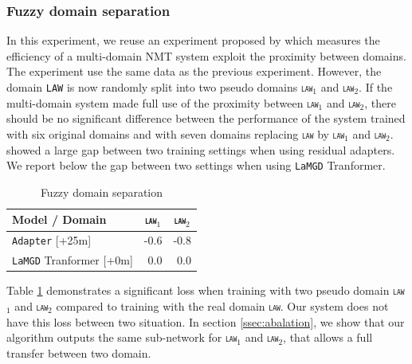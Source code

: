 \documentclass[11pt]{article}
\newcommand{\domain}[1]{\texttt{\textsc{#1}}}
\newcommand{\system}[1]{\texttt{{#1}}}
\begin{document}
\subsubsection{Fuzzy domain separation}
\label{ssec:fuzzy}
In this experiment, we reuse an experiment proposed by \citet{Pham21revisiting} which measures the efficiency of a multi-domain NMT system exploit the proximity between domains. The experiment use the same data as the previous experiment. However, the domain \domain{LAW} is now randomly split into two pseudo domains \domain{law$_1$} and \domain{law$_2$}. If the multi-domain system made full use of the proximity between \domain{law$_1$} and \domain{law$_2$}, there should be no significant difference between the performance of the system trained with six original domains and with seven domains replacing \domain{law} by \domain{law$_1$} and \domain{law$_2$}. \citet{Pham21revisiting} showed a large gap between two training settings when using residual adapters. We report below the gap between two settings when using \system{LaMGD} Tranformer. 
\begin{table}[h!]
  \centering
  \begin{tabular}{|p{4cm}|*{2}{r|}} \hline
    Model / Domain & \multicolumn{1}{c|}{\domain{law$_1$}} & \multicolumn{1}{c|}{\domain{law$_2$}} \\ \hline 
    \system{Adapter}   \hfill{\footnotesize[+25m]}  & -0.6 & -0.8 \\ 
    \system{LaMGD} Tranformer   \hfill{\footnotesize[+0m]}  & 0.0 & 0.0 \\ 
    \hline
  \end{tabular}
  \caption{Fuzzy domain separation}
  \label{tab:fuzzy}
\end{table}

Table \ref{tab:fuzzy} demonstrates a significant loss when training with two pseudo domain \domain{law$_1$} and \domain{law$_2$} compared to training with the real domain \domain{law}. Our system does not have this loss between two situation. In section \ref{ssec:abalation}, we show that our algorithm outputs the same sub-network for \domain{law$_1$} and \domain{law$_2$}, that allows a full transfer between two domain.
\end{document}
